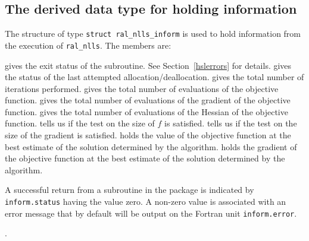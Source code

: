 \documentclass{spec}
\begin{document}
\subsection{The derived data type for holding information}
\label{typeinform}
The structure of type {\tt struct ral\_nlls\_inform} is used
to hold information from the execution of {\tt ral\_nlls}.
The members are:
\begin{description}
 gives the exit status of the subroutine.  See Section~\ref{hslerrors} for details.
 gives the status of the last attempted allocation/deallocation.
 gives the total number of iterations performed.
 gives the total number of evaluations of the objective function.
 gives the total number of evaluations of the gradient of the objective function.
 gives the total number of evaluations of the Hessian of the objective function.
 tells us if the test on the size of \(f\) is satisfied.
 tells us if the test on the size of the gradient is satisfied.
 holds the value of the objective function at the best estimate of the solution determined by the algorithm.
 holds the gradient of the objective function at the best estimate of the solution determined by the algorithm.
\end{description}


\hslerrors

A successful return from a subroutine in the package is indicated by
{\tt inform.status} having the value zero.
A non-zero value is associated with an error message that by default will
be output on the Fortran unit {\tt inform.error}.



\hslgeneral

.

\hslmethod
\label{method}

%

\hslexample




\end{document}
